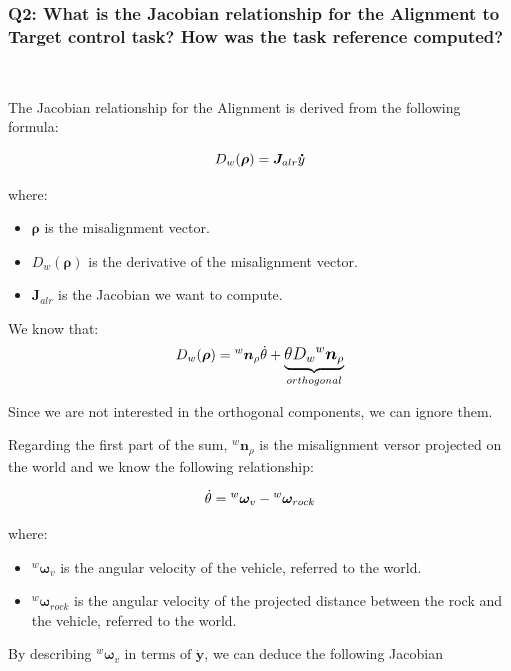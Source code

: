 \documentclass{article}
\begin{document}
\subsubsection{Q2: What is the Jacobian relationship for the Alignment to Target control task? How was the task reference computed?} \

The Jacobian relationship for the Alignment is derived from the following formula:

\begin{equation}
\large
D_{w}(\boldsymbol \rho)=\boldsymbol J_{alr} \boldsymbol \dot{y}
\end{equation}

where:
\begin{itemize}
\item $\boldsymbol \rho$ is the misalignment vector.
\item $D_{w}(\boldsymbol \rho)$ is the derivative of the misalignment vector.
\item $\boldsymbol J_{alr} $ is the Jacobian we want to compute.
\end{itemize}

We know that:
\begin{equation}
\large
D_{w}(\boldsymbol \rho)={^w}\boldsymbol n_{\rho} \dot\theta+\underbrace{\theta D_{w} {^w}{\boldsymbol n_{\rho}}}_{orthogonal}
\end{equation}

Since we are not interested in the orthogonal components, we can ignore them.

Regarding the first part of the sum, ${^w}\boldsymbol n_{\rho}$ is the misalignment versor projected on the world and we know the following relationship:

\begin{equation}
\large
\dot{\theta}={^w}\boldsymbol{\omega}_{v} - {^w}{\boldsymbol\omega_{{rock}}}
\end{equation}

where:
\begin{itemize}
\item ${^w}\boldsymbol{\omega}_{v}$ is the angular velocity of the vehicle, referred to the world.
\item ${^w}\boldsymbol{\omega}_{rock}$ is the angular velocity of the projected distance between the rock and the vehicle, referred to the world.
\end{itemize}

By describing  ${^w}{\boldsymbol{\omega}}_{v} \text{ in terms of } \boldsymbol{\dot{y}} $, we can deduce the following Jacobian
\end{document}

